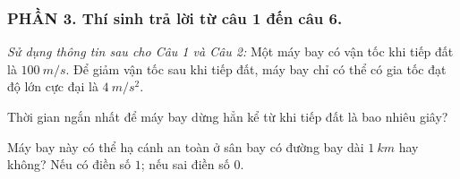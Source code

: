 \subsubsection*{PHẦN 3. Thí sinh trả lời từ câu 1 đến câu 6.}
\setcounter{ex}{0}
\noindent\textit{Sử dụng thông tin sau cho Câu 1 và Câu 2:} Một máy bay có vận tốc khi tiếp đất là $100\ m/s$. Để giảm vận tốc sau khi tiếp đất, máy bay chỉ có thể có gia tốc đạt độ lớn cực đại là $4\ m/s^2$.
\begin{ex}%
Thời gian ngắn nhất để máy bay dừng hẳn kể từ khi tiếp đất là bao nhiêu giây?
\end{ex}
\begin{ex}		
Máy bay này có thể hạ cánh an toàn ở sân bay có đường bay dài $1\ km$ hay không? Nếu có điền số $1$; nếu sai điền số $0$.
 \end{ex}











